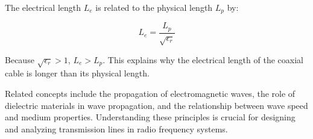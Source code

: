 The electrical length \( L_e \) is related to the physical length \( L_p \) by:

\[
L_e = \frac{L_p}{\sqrt{\epsilon_r}}
\]

Because \( \sqrt{\epsilon_r} > 1 \), \( L_e > L_p \). This explains why the electrical length of the coaxial cable is longer than its physical length.

Related concepts include the propagation of electromagnetic waves, the role of dielectric materials in wave propagation, and the relationship between wave speed and medium properties. Understanding these principles is crucial for designing and analyzing transmission lines in radio frequency systems.

